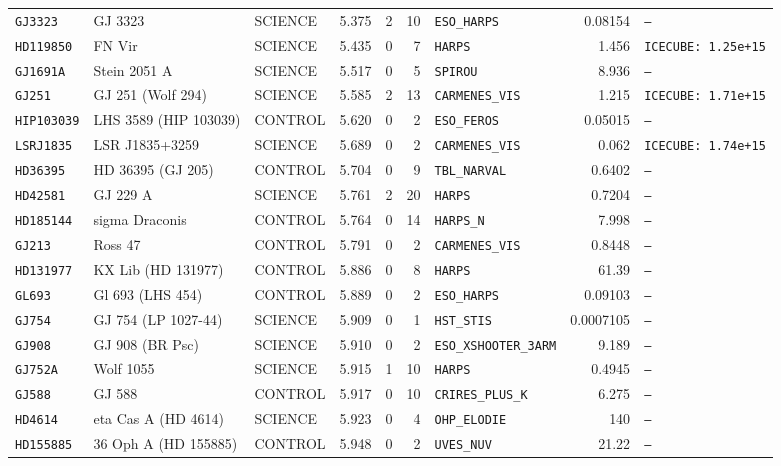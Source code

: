 \documentclass[twocolumn,10pt]{article}
\begin{document}
\begin{table}[!ht]
{\begin{tabular}{llllrrlrl}
\texttt{GJ3323} & GJ 3323 & SCIENCE & 5.375 & 2 & 10 & \texttt{ESO\_HARPS} & 0.08154 & \texttt{---} \\
\texttt{HD119850} & FN Vir & SCIENCE & 5.435 & 0 & 7 & \texttt{HARPS} & 1.456 & \texttt{ICECUBE: 1.25e+15} \\
\texttt{GJ1691A} & Stein 2051 A & SCIENCE & 5.517 & 0 & 5 & \texttt{SPIROU} & 8.936 & \texttt{---} \\
\texttt{GJ251} & GJ 251 (Wolf 294) & SCIENCE & 5.585 & 2 & 13 & \texttt{CARMENES\_VIS} & 1.215 & \texttt{ICECUBE: 1.71e+15} \\
\texttt{HIP103039} & LHS 3589 (HIP 103039) & CONTROL & 5.620 & 0 & 2 & \texttt{ESO\_FEROS} & 0.05015 & \texttt{---} \\
\texttt{LSRJ1835} & LSR J1835+3259 & SCIENCE & 5.689 & 0 & 2 & \texttt{CARMENES\_VIS} & 0.062 & \texttt{ICECUBE: 1.74e+15} \\
\texttt{HD36395} & HD 36395 (GJ 205) & CONTROL & 5.704 & 0 & 9 & \texttt{TBL\_NARVAL} & 0.6402 & \texttt{---} \\
\texttt{HD42581} & GJ 229 A & SCIENCE & 5.761 & 2 & 20 & \texttt{HARPS} & 0.7204 & \texttt{---} \\
\texttt{HD185144} & sigma Draconis & CONTROL & 5.764 & 0 & 14 & \texttt{HARPS\_N} & 7.998 & \texttt{---} \\
\texttt{GJ213} & Ross 47 & CONTROL & 5.791 & 0 & 2 & \texttt{CARMENES\_VIS} & 0.8448 & \texttt{---} \\
\texttt{HD131977} & KX Lib (HD 131977) & CONTROL & 5.886 & 0 & 8 & \texttt{HARPS} & 61.39 & \texttt{---} \\
\texttt{GL693} & Gl 693 (LHS 454) & CONTROL & 5.889 & 0 & 2 & \texttt{ESO\_HARPS} & 0.09103 & \texttt{---} \\
\texttt{GJ754} & GJ 754 (LP 1027-44) & SCIENCE & 5.909 & 0 & 1 & \texttt{HST\_STIS} & 0.0007105 & \texttt{---} \\
\texttt{GJ908} & GJ 908 (BR Psc) & SCIENCE & 5.910 & 0 & 2 & \texttt{ESO\_XSHOOTER\_3ARM} & 9.189 & \texttt{---} \\
\texttt{GJ752A} & Wolf 1055 & SCIENCE & 5.915 & 1 & 10 & \texttt{HARPS} & 0.4945 & \texttt{---} \\
\texttt{GJ588} & GJ 588 & CONTROL & 5.917 & 0 & 10 & \texttt{CRIRES\_PLUS\_K} & 6.275 & \texttt{---} \\
\texttt{HD4614} & eta Cas A (HD 4614) & SCIENCE & 5.923 & 0 & 4 & \texttt{OHP\_ELODIE} & 140 & \texttt{---} \\
\texttt{HD155885} & 36 Oph A (HD 155885) & CONTROL & 5.948 & 0 & 2 & \texttt{UVES\_NUV} & 21.22 & \texttt{---} \\

\end{tabular}}
\end{table}
\end{document}
